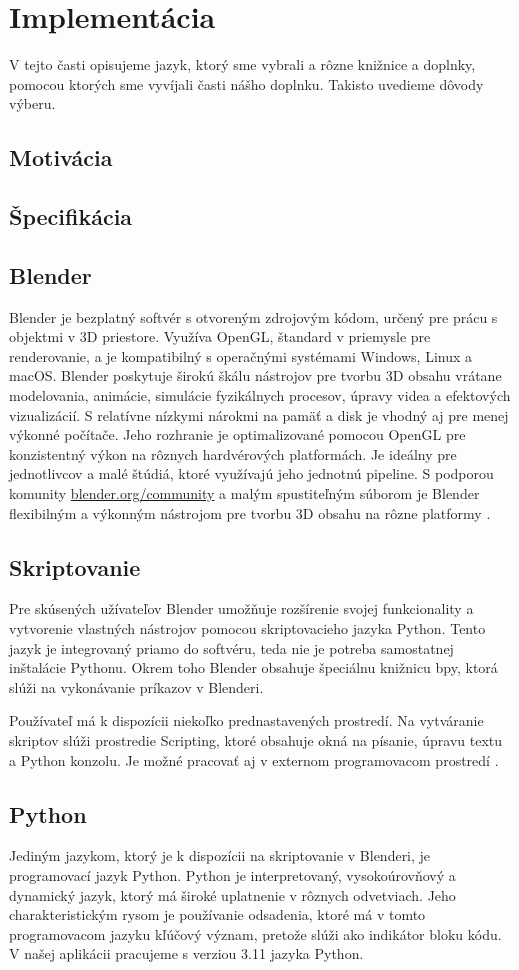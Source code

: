\chapter{Implementácia}
V tejto časti opisujeme jazyk, ktorý sme vybrali a rôzne knižnice a doplnky, pomocou
ktorých sme vyvíjali časti nášho doplnku. Takisto uvedieme dôvody výberu.
\section{Motivácia}
\section{Špecifikácia}
\section{Blender}
Blender je bezplatný softvér s otvoreným zdrojovým kódom, určený pre prácu s objektmi v 3D priestore. Využíva OpenGL, štandard v priemysle pre renderovanie, a je kompatibilný s operačnými systémami Windows, Linux a macOS. 
Blender poskytuje širokú škálu nástrojov pre tvorbu 3D obsahu vrátane modelovania, animácie, simulácie fyzikálnych procesov, úpravy videa a efektových vizualizácií. S relatívne nízkymi nárokmi na pamäť a disk je vhodný aj pre menej výkonné počítače. Jeho rozhranie je optimalizované pomocou OpenGL pre konzistentný výkon na rôznych hardvérových platformách. Je ideálny pre jednotlivcov a malé štúdiá, ktoré využívajú jeho jednotnú pipeline. S podporou komunity \url{blender.org/community} a malým spustiteľným súborom je Blender flexibilným a výkonným nástrojom pre tvorbu 3D obsahu na rôzne platformy \cite{Blender}. 
\section{Skriptovanie}
Pre skúsených užívateľov Blender umožňuje rozšírenie svojej funkcionality a vytvorenie vlastných nástrojov pomocou skriptovacieho jazyka Python. Tento jazyk je integrovaný priamo do softvéru, teda nie je potreba samostatnej inštalácie Pythonu. Okrem toho Blender obsahuje špeciálnu knižnicu bpy, ktorá slúži na vykonávanie príkazov v Blenderi.

Používateľ má k dispozícii niekoľko prednastavených prostredí. Na vytváranie skriptov slúži prostredie Scripting, ktoré obsahuje okná na písanie, úpravu textu a Python konzolu. Je možné pracovať aj v externom programovacom prostredí \cite{BlenderAPI}.
\section{Python}
Jediným jazykom, ktorý je k dispozícii na skriptovanie v Blenderi, je programovací jazyk Python. Python je interpretovaný, vysokoúrovňový a dynamický jazyk, ktorý má široké uplatnenie v rôznych odvetviach. Jeho charakteristickým rysom je používanie odsadenia, ktoré má v tomto programovacom jazyku kľúčový význam, pretože slúži ako indikátor bloku kódu. V našej aplikácii pracujeme s verziou 3.11 jazyka Python.
